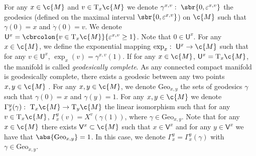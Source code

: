 For any $x \in \c{M}$ and $v \in \mathrm{T}_x \c{M}$ we denote $\gamma^{x,v}: \ \sbr{0,\varepsilon^{x,v}}$ the geodesics (defined on the maximal interval $\sbr{0, \varepsilon^{x,v}}$) on $\c{M}$ such that $\gamma(0) = x$ and $\dot \gamma(0) = v$.
We denote $\mathsf{U}^x = \cbrcolon{v \in \mathrm{T}_x \c{M}}{\varepsilon^{x,v} \geq 1}$.
Note that $0 \in \mathsf{U}^x$.
For any $x \in \c{M}$, we define the exponential mapping $\exp_x: \ \mathsf{U}^x \to \c{M}$ such that for any $v \in \mathsf{U}^x$, $\exp_x(v) = \gamma^{x,v}(1)$.
If for any $x \in \c{M}$, $\mathsf{U}^x = \mathrm{T}_x \c{M}$, the manifold is called \emph{geodesically complete}.
As any connected compact manifold is geodesically complete, there exists a geodesic between any two points $x, y \in \c{M}$ \cite[see][Lemma 6.18]{lee2018introduction}.
For any $x, y \in \c{M}$, we denote $\mathrm{Geo}_{x,y}$ the sets of geodesics $\gamma$ such that $\gamma(0) = x$ and $\gamma(y) = 1$.
For any $x, y \in \c{M}$ we denote $\Gamma_x^y(\gamma) : \ \mathrm{T}_x \c{M} \to \mathrm{T}_y \c{M}$ the linear isomorphism such that for any $v \in \mathrm{T}_x \c{M}$, $\Gamma_x^y(v) = X^v(\gamma(1))$, where $\gamma \in \mathrm{Geo}_{x,y}$.
Note that for any $x \in \c{M}$ there exists $\mathsf{V}^x \subset \c{M}$ such that $x \in \mathsf{V}^x$ and for any $y \in \mathsf{V}^x$ we have that $\abs{\mathrm{Geo}_{x,y}}=1$.
In this case, we denote $\Gamma_x^y = \Gamma_x^y(\gamma)$ with $\gamma \in \mathrm{Geo}_{x,y}$.

